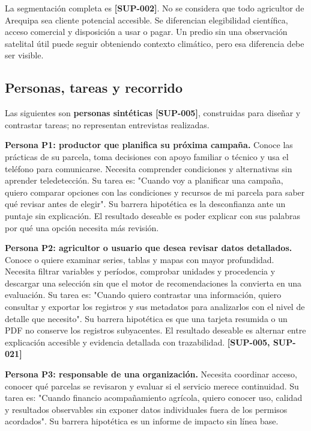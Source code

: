 \documentclass[10pt,a4paper]{article}
\begin{document}
La segmentación completa es \textbf{[SUP-002]}. No se considera que todo agricultor de Arequipa sea cliente potencial accesible. Se diferencian elegibilidad científica, acceso comercial y disposición a usar o pagar. Un predio sin una observación satelital útil puede seguir obteniendo contexto climático, pero esa diferencia debe ser visible.


\subsection{Personas, tareas y recorrido}

Las siguientes son \textbf{personas sintéticas [SUP-005]}, construidas para diseñar y contrastar tareas; no representan entrevistas realizadas.


\textbf{Persona P1: productor que planifica su próxima campaña.} Conoce las prácticas de su parcela, toma decisiones con apoyo familiar o técnico y usa el teléfono para comunicarse. Necesita comprender condiciones y alternativas sin aprender teledetección. Su tarea es: "Cuando voy a planificar una campaña, quiero comparar opciones con las condiciones y recursos de mi parcela para saber qué revisar antes de elegir". Su barrera hipotética es la desconfianza ante un puntaje sin explicación. El resultado deseable es poder explicar con sus palabras por qué una opción necesita más revisión.


\textbf{Persona P2: agricultor o usuario que desea revisar datos detallados.} Conoce o quiere examinar series, tablas y mapas con mayor profundidad. Necesita filtrar variables y períodos, comprobar unidades y procedencia y descargar una selección sin que el motor de recomendaciones la convierta en una evaluación. Su tarea es: "Cuando quiero contrastar una información, quiero consultar y exportar los registros y sus metadatos para analizarlos con el nivel de detalle que necesito". Su barrera hipotética es que una tarjeta resumida o un PDF no conserve los registros subyacentes. El resultado deseable es alternar entre explicación accesible y evidencia detallada con trazabilidad. \textbf{[SUP-005, SUP-021]}


\textbf{Persona P3: responsable de una organización.} Necesita coordinar acceso, conocer qué parcelas se revisaron y evaluar si el servicio merece continuidad. Su tarea es: "Cuando financio acompañamiento agrícola, quiero conocer uso, calidad y resultados observables sin exponer datos individuales fuera de los permisos acordados". Su barrera hipotética es un informe de impacto sin línea base.
\end{document}
